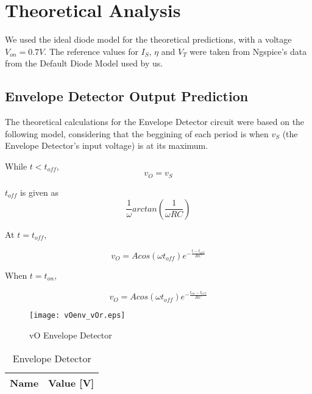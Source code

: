 \section{Theoretical Analysis}
\label{sec:analysis}

We used the ideal diode model for the theoretical predictions, with a voltage $V_{on}=0.7V$. The reference values for $I_S$, $\eta$ and $V_T$ were taken from Ngspice's data from the Default Diode Model used by us.

\subsection{Envelope Detector Output Prediction}
\label{ed}

The theoretical calculations for the Envelope Detector circuit were based on the following model, considering that the beggining of each period is when $v_S$ (the Envelope Detector's input voltage) is at its maximum. \par

While $t<t_{off}$,
\begin{equation}
v_O=v_S
\label{eq:kvl3}
\end{equation}

 $t_{off}$ is given as 
\begin{equation}
\frac{1}{\omega}arctan(\frac{1}{\omega RC})
\label{eq:kvl4}
\end{equation}

At $t=t_{off}$, 

\begin{equation}
v_O=Acos(\omega t_{off})e^{-\frac{t-t_{off}}{RC}}
\label{eq:kvl5}
\end{equation}

When $t=t_{on}$,

\begin{equation}
v_O=Acos(\omega t_{off})e^{-\frac{t_{on}-t_{off}}{RC}}
\label{eq:kvl6}
\end{equation}

\begin{figure}[h] \centering
\texttt{[image: vOenv\_vOr.eps]}
\caption{vO Envelope Detector}
\label{fig:vOenv}
\end{figure}

\begin{table}[h]
  \centering
  \begin{tabular}{|l|r|}
    \hline    
    {\bf Name} & {\bf Value [V]} \\ \hline
    
  \end{tabular}
  \caption{Envelope Detector}
  \label{tab:Envelope}
\end{table}
\FloatBarrier


